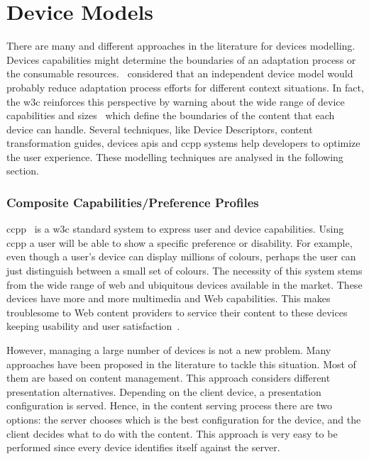 
\section{Device Models}
\label{sec:devices}

There are many and different approaches in the literature for devices modelling.
Devices capabilities might determine the boundaries of an adaptation process or
the consumable resources.~\citet{lemlouma_context_aware_2004} considered that
an independent device model would probably reduce adaptation process efforts for
different context situations. In fact, the \ac{w3c} reinforces this perspective
by warning about the wide range of device capabilities and 
sizes~\citep{device_independence} which define the boundaries of the content
that each device can handle. Several techniques, like Device Descriptors, content
transformation guides, devices \acp{api} and \ac{ccpp} systems help developers 
to optimize the user experience. These modelling techniques are analysed in the 
following section. 

\subsubsection{Composite Capabilities/Preference Profiles}
\label{sec:ccpp}
\ac{ccpp}~\citep{ccpp_status} is a \ac{w3c} standard system to express user and 
device capabilities. Using \ac{ccpp} a user will be able to show a specific 
preference or disability. For example, even though a user's device can display 
millions of colours, perhaps the user can just distinguish between a small set 
of colours. The necessity of this system stems from the wide range of web and 
ubiquitous devices available in the market. These devices have more and more 
multimedia and Web capabilities. This makes troublesome to Web content providers 
to service their content to these devices keeping usability and user 
satisfaction~\citep{lemlouma_context_aware_2004}. 

However, managing a large number of devices is not a new problem. Many approaches 
have been proposed in the literature to tackle this situation. Most of them are 
based on content management. This approach considers different presentation 
alternatives. Depending on the client device, a presentation configuration is 
served. Hence, in the content serving process there are two options: the 
server chooses which is the best configuration for the device, and the client 
decides what to do with the content. This approach is very easy to be performed 
since every device identifies itself against the server.

